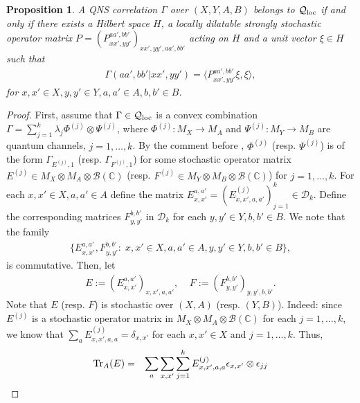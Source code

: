 \documentclass[11pt]{amsart}
\newtheorem{proposition}[theorem]{Proposition}
\newcommand{\cl}[1]{\mathcal{#1}}
\newcommand{\bb}[1]{\mathbb{#1}}
\begin{document}
\begin{proposition}\label{qloc_prop}
A QNS correlation $\Gamma$ over $(X, Y, A, B)$ belongs to $\cl{Q}_{\rm loc}$ if and only if there exists a Hilbert space $H$, a locally dilatable strongly stochastic operator matrix $P = (P_{xx', yy'}^{aa', bb'})_{xx', yy', aa', bb'}$ acting on $H$ and a unit vector $\xi \in H$ such that
\begin{gather}\label{qloc_value}
	\Gamma(aa', bb'|xx', yy') = \langle P_{xx', yy'}^{aa', bb'}\xi, \xi\rangle, 
\end{gather}
\noindent for  $x, x' \in X, y, y' \in Y, a, a' \in A, b, b' \in B$.
\end{proposition}
\begin{proof}
First, assume that $\Gamma \in \cl{Q}_{\rm loc}$ is a convex combination $\Gamma = \sum_{j=1}^{k}\lambda_{j}\Phi^{(j)}\otimes \Psi^{(j)}$, where $\Phi^{(j)}: M_{X}\rightarrow M_{A}$ and $\Psi^{(j)}: M_{Y}\rightarrow M_{B}$ are quantum channels, $j = 1, \hdots, k$. By the comment before \cite[Remark 3.2]{tt}, $\Phi^{(j)}$ (resp. $\Psi^{(j)}$) is of the form $\Gamma_{E^{(j)}, 1}$ (resp. $\Gamma_{F^{(j)}, 1}$) for some stochastic operator matrix $E^{(j)} \in M_{X}\otimes M_{A}\otimes \cl{B}(\bb{C})$ (resp. $F^{(j)} \in M_{Y}\otimes M_{B}\otimes \cl{B}(\bb{C})$) for $j = 1, \hdots, k$. For each $x, x' \in X, a, a' \in A$ define the matrix $E_{x, x'}^{a, a'} = (E_{x, x', a, a'}^{(j)})_{j=1}^{k} \in \cl{D}_{k}$. Define the corresponding matrices $F_{y, y'}^{b, b'}$ in $\cl{D}_{k}$ for each $y, y' \in Y, b, b' \in B$. We note that the family
\begin{gather*}
	\{E_{x, x'}^{a, a'}, F_{y, y'}^{b, b'}: \; x, x' \in X, a, a' \in A, y, y' \in Y, b, b' \in B\}, 
\end{gather*}
\noindent is commutative. Then, let
\begin{gather*}
	E:= (E_{x, x'}^{a, a'})_{x, x', a, a'}, \;\;\;\; F := (F_{y, y'}^{b, b'})_{y, y', b, b'}.
\end{gather*}
\noindent Note that $E$ (resp. $F$) is stochastic over $(X, A)$ (resp. $(Y, B)$). Indeed: since $E^{(j)}$ is a stochastic operator matrix in $M_{X}\otimes M_{A}\otimes \cl{B}(\bb{C})$ for each $j = 1, \hdots, k$, we know that $\sum\limits_{a}E_{x, x', a, a}^{(j)} = \delta_{x, x'}$ for each $x, x' \in X$ and $j = 1, \hdots, k$. Thus,
\begin{eqnarray*}
	{\rm Tr}_{A}(E) 
& = &
\sum\limits_{a}\sum\limits_{x, x'}\sum\limits_{j=1}^{k}E_{x, x', a, a}^{(j)}\epsilon_{x, x'}\otimes \epsilon_{jj} \\

\end{eqnarray*}
\end{proof}
\end{document}
